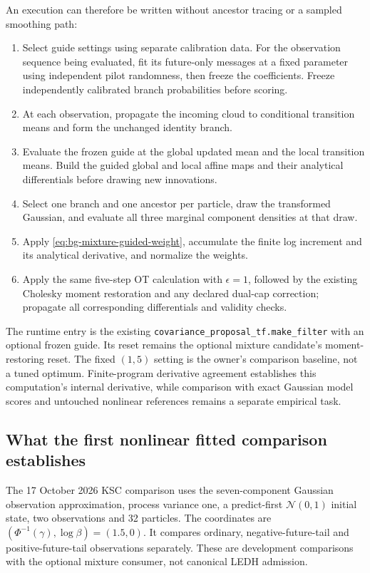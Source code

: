 An execution can therefore be written without ancestor tracing or a sampled
smoothing path:
\begin{enumerate}
 \item Select guide settings using separate calibration data. For the
 observation sequence being evaluated, fit its future-only messages at a fixed
 parameter using independent pilot randomness, then freeze the coefficients.
 Freeze independently calibrated branch probabilities before scoring.
 \item At each observation, propagate the incoming cloud to conditional
 transition means and form the unchanged identity branch.
 \item Evaluate the frozen guide at the global updated mean and the local
 transition means. Build the guided global and local affine maps and their
 analytical differentials before drawing new innovations.
 \item Select one branch and one ancestor per particle, draw the transformed
 Gaussian, and evaluate all three marginal component densities at that draw.
 \item Apply \eqref{eq:bg-mixture-guided-weight}, accumulate the finite log
 increment and its analytical derivative, and normalize the weights.
 \item Apply the same five-step OT calculation with $\epsilon=1$, followed
 by the existing Cholesky moment restoration and any declared dual-cap
 correction; propagate all corresponding differentials and validity checks.
\end{enumerate}
The runtime entry is the existing
\texttt{covariance\_proposal\_tf.make\_filter} with an optional frozen guide.
Its reset remains the optional mixture candidate's moment-restoring reset.
The fixed $(1,5)$ setting is the owner's comparison baseline, not a tuned
optimum. Finite-program derivative agreement establishes this computation's
internal derivative, while comparison with exact Gaussian model scores and
untouched nonlinear references remains a separate empirical task.

\subsection{What the first nonlinear fitted comparison establishes}
\label{sec:bg-ksc-fitted-result}

The 17 October 2026 KSC comparison uses the seven-component Gaussian
observation approximation, process variance one, a predict-first
$\mathcal N(0,1)$ initial state, two observations and 32 particles. The
coordinates are $(\Phi^{-1}(\gamma),\log\beta)=(1.5,0)$. It compares
ordinary, negative-future-tail and positive-future-tail observations
separately. These are development comparisons with the optional mixture
consumer, not canonical LEDH admission.

